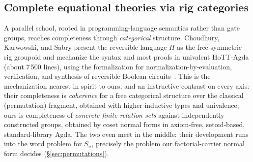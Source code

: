 \subsection{Complete equational theories via rig categories}

A parallel school, rooted in programming-language semantics rather than
gate groups, reaches completeness through \emph{categorical} structure.
Choudhury, Karwowski, and Sabry present the reversible language $\Pi$ as
the free symmetric rig groupoid and mechanize the syntax and most proofs
in univalent HoTT-Agda (about 7\,500 lines), using the formalization for
normalization-by-evaluation, verification, and synthesis of reversible
Boolean circuits~\cite{choudhury2022symmetries}.  This is the
mechanization nearest in spirit to ours, and an instructive contrast on
every axis: their completeness is \emph{coherence} for a free categorical
structure over the classical (permutation) fragment, obtained with higher
inductive types and univalence; ours is completeness of \emph{concrete
finite relation sets} against independently constructed groups, obtained
by coset normal forms in axiom-free, setoid-based, standard-library Agda.
The two even meet in the middle: their development runs into the word
problem for $S_n$, precisely the problem our factorial-carrier normal
form decides (\S\ref{sec:permutations}).

